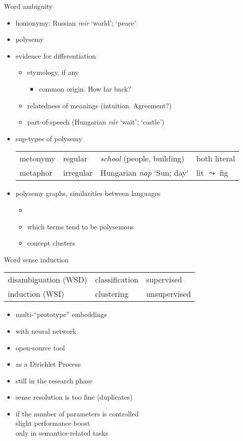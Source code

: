 \documentclass[10pt]{beamer}%
\newcommand{\bull}[1]{\begin{itemize}\item #1 \end{itemize}}
\begin{document}
\begin{frame}{Word ambiguity}
  \begin{itemize}
    \item homonymy: Russian \emph{mir} `world'; `peace'
    \item polysemy
    \item evidence for differentiation
      \begin{itemize}
        \item etymology, if any
          \bull{common origin. How far back?}
        \item relatedness of meanings (intuition. Agreement?)
        \item part-of-speech (Hungarian \emph{vár} `wait'; `castle')
      \end{itemize}
    \item sup-types of polysemy
      \begin{tabular}{llll}
        metonymy & regular    & \emph{school} (people, building)  & both literal \\
        metaphor & irregular  & Hungarian \emph{nap} `Sun; day'   & lit $\leadsto$ fig
      \end{tabular}
    \item polysemy graphs, similarities between languages
      \begin{itemize}
        \item \cite{Youn:2016}
        \item which terms tend to be polysemous
        \item concept clusters
      \end{itemize}
  \end{itemize}
\end{frame}
\begin{frame}{Word sense induction}
  \begin{tabular} {lll}
    \toprule
    disambiguation (WSD) & classification & supervised \\
    induction (WSI) \citep{Schutze:1998} & clustering & unsupervised \\
    \bottomrule
  \end{tabular}
    \begin{itemize}
      \item multi-``prototype'' embeddings \citep{Reisinger:2010}
      \item with neural network \citep{Huang:2012}
      \item open-source tool \citep{Neelakantan:2014}
      \item as a Dirichlet Process \cite{Li:2015,Bartunov:2015}
      \item still in the research phase
      \item sense resolution is too fine (duplicates)
      \item if the number of parameters is controlled \\
        slight performance boost \\
            only in semantics-related tasks \citep{Li:2015}
    \end{itemize}
\end{frame}
\end{document}
